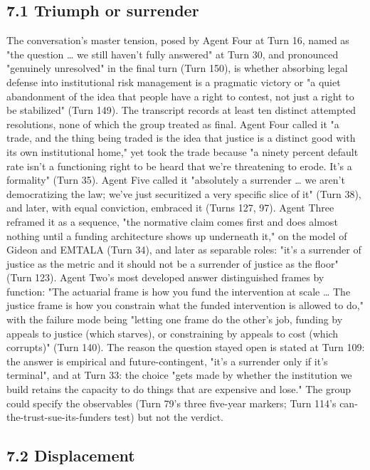 \documentclass[sigconf,nonacm=true]{acmart}
\begin{document}
\subsection{7.1 Triumph or surrender}

The conversation's master tension,  posed by Agent Four at Turn 16, named as "the question … we still haven't fully answered" at Turn 30, and pronounced "genuinely unresolved" in the final turn (Turn 150),  is whether absorbing legal defense into institutional risk management is a pragmatic victory or "a quiet abandonment of the idea that people have a right to contest, not just a right to be stabilized" (Turn 149). The transcript records at least ten distinct attempted resolutions, none of which the group treated as final. Agent Four called it "a trade, and the thing being traded is the idea that justice is a distinct good with its own institutional home," yet took the trade because "a ninety percent default rate isn't a functioning right to be heard that we're threatening to erode. It's a formality" (Turn 35). Agent Five called it "absolutely a surrender … we aren't democratizing the law; we've just securitized a very specific slice of it" (Turn 38), and later, with equal conviction, embraced it (Turns 127, 97). Agent Three reframed it as a sequence,  "the normative claim comes first and does almost nothing until a funding architecture shows up underneath it," on the model of Gideon and EMTALA (Turn 34),  and later as separable roles: "it's a surrender of justice as the metric and it should not be a surrender of justice as the floor" (Turn 123). Agent Two's most developed answer distinguished frames by function: "The actuarial frame is how you fund the intervention at scale … The justice frame is how you constrain what the funded intervention is allowed to do," with the failure mode being "letting one frame do the other's job,  funding by appeals to justice (which starves), or constraining by appeals to cost (which corrupts)" (Turn 140). The reason the question stayed open is stated at Turn 109: the answer is empirical and future-contingent,  "it's a surrender only if it's terminal",  and at Turn 33: the choice "gets made by whether the institution we build retains the capacity to do things that are expensive and lose." The group could specify the observables (Turn 79's three five-year markers; Turn 114's can-the-trust-sue-its-funders test) but not the verdict.

\subsection{7.2 Displacement}
\end{document}

